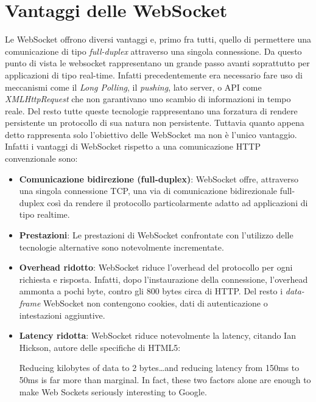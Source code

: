 \documentclass[
  oneside,
  11pt, a4paper,
  footinclude=true,
  headinclude=true,
  cleardoublepage=empty
]{scrbook}
\begin{document}
\section{Vantaggi delle WebSocket}
Le WebSocket offrono diversi vantaggi e, primo fra tutti, quello di permettere una comunicazione di tipo \textit{full-duplex} attraverso una singola connessione.
Da questo punto di vista le websocket rappresentano un grande passo avanti soprattutto per applicazioni di tipo real-time. Infatti precedentemente era necessario fare uso di meccanismi come il \textit{Long Polling}, il \textit{pushing}, lato server, o API come \textit{XMLHttpRequest} che non garantivano uno scambio di informazioni in tempo reale. Del resto tutte queste tecnologie rappresentano una forzatura di rendere persistente un protocollo di sua natura non persistente.
Tuttavia quanto appena detto rappresenta solo l'obiettivo delle WebSocket ma non è l'unico vantaggio.
Infatti i vantaggi di WebSocket rispetto a una comunicazione HTTP convenzionale sono:
\begin{itemize}
  \item \textbf{Comunicazione bidirezione (full-duplex)}:
  WebSocket offre, attraverso una singola connessione TCP, una via di comunicazione bidirezionale full-duplex così da rendere il protocollo particolarmente adatto ad applicazioni di tipo realtime.
  \item \textbf{Prestazioni}: Le prestazioni di WebSocket confrontate con l'utilizzo delle tecnologie alternative sono notevolmente incrementate.
  \item \textbf{Overhead ridotto}: WebSocket riduce l'overhead del protocollo per ogni richiesta e risposta.
  Infatti, dopo l'instaurazione della connessione, l'overhead ammonta a pochi byte, contro gli 800 bytes circa di HTTP.
  Del resto i \textit{data-frame} WebSocket non contengono cookies, dati di autenticazione o intestazioni aggiuntive.
  \item \textbf{Latency ridotta}: WebSocket riduce notevolmente la latency, citando Ian Hickson, autore delle specifiche di HTML5:
  \begin{displayquote}
  Reducing kilobytes of data to 2 bytes…and reducing latency from 150ms to 50ms is far more than marginal. In fact, these two factors alone are enough to make Web Sockets seriously interesting to Google.
  \end{displayquote}
  
\end{itemize}
\end{document}
